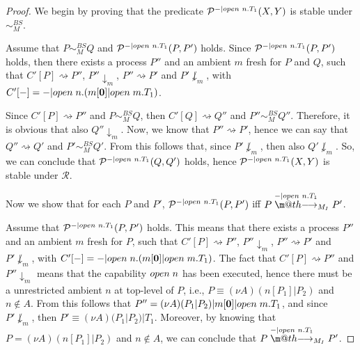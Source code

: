 \documentclass[copyright,creativecommons]{eptcs}
\makeatletter
\newcommand{\nil}{\mathbf{0}}
\def\tr#1{\stackrel{#1}{\to}}
\let\oldrightarrow\to
\renewcommand{\to}[1][]{\ifthenelse{\equal{#1}{}}{\oldrightarrow}{\ensuremath{\xrightarrow{{}_{#1}}}}}
\def \rightarrowfill{\m@th\mathord{\smash-}\mkern-6mu\cleaders\hbox{$\mkern-2mu\mathord{\smash-}\mkern-2mu$}\hfill
  \mkern-6mu\mathord\rightarrow}
\newcommand{\barb}[1]{\downarrow_{#1}}
\newcommand{\bsbis}{\sim^{BS}}
\def\tr#1{\stackrel{#1}{\rightarrowfill}}
\newcommand{\react}{\rightsquigarrow}
\newcommand{\<}{\langle}
\renewcommand{\>}{\rangle}
\def\tr#1{\stackrel{#1}{\rightarrowfill}}
\def \rightarrowfill{\m@th\mathord{\smash-}\mkern-6mu\cleaders\hbox{$\mkern-2mu\mathord{\smash-}\mkern-2mu$}\hfill
  \mkern-6mu\mathord\rightarrow}
\makeatother
\begin{document}
\begin{proof}
We begin by proving that the predicate $\mathcal P^{-|open \hspace{1mm} n.T_1}(X,Y)$
is stable under $\bsbis_{\scriptscriptstyle{M}}$.

Assume that $P \bsbis_{\scriptscriptstyle{M}} Q$ and $\mathcal P^{-|open \hspace{1mm} n.T_1}(P,P')$ holds.
Since $\mathcal P^{-|open \hspace{1mm} n.T_1}(P,P')$ holds, then
there exists a process $P''$ and an ambient $m$ fresh for $P$ and $Q$,
such that $C'[P] \react P''$, $P'' \barb m$,
$P'' \react P'$ and $P' \not \barb m$, with
$C'[-] = -|open \hspace{1mm} n.(m[\nil]|open \hspace{1mm} m.T_1)$.

Since $C'[P] \react P''$ and $P \bsbis_{\scriptscriptstyle{M}} Q$, then
$C'[Q] \react Q''$ and $P'' \bsbis_{\scriptscriptstyle{M}} Q''$.
Therefore, it is obvious that also $Q'' \barb m$.
Now, we know that $P'' \react P'$, hence we can say
that $Q'' \react Q'$ and $P' \bsbis_{\scriptscriptstyle{M}} Q'$.
From this follows that, since $P' \not \barb m$, then also $Q' \not \barb m$.
So, we can conclude that $\mathcal P^{-|open \hspace{1mm} n.T_1}(Q,Q')$ holds, hence $\mathcal P^{-|open \hspace{1mm} n.T_1}(X,Y)$
is stable under $\mathcal R$.

Now we show that for each $P$ and $P'$, $\mathcal P^{-|open \hspace{1mm} n.T_1}(P,P')$ iff
$P \tr{-|open \hspace{1mm} n.T_1}_{M_I} P'$.

Assume that $\mathcal P^{-|open \hspace{1mm} n.T_1}(P,P')$ holds.
This means that there exists a process $P''$ and an ambient $m$ fresh for $P$,
such that $C'[P] \react P''$, $P'' \barb m$,
$P'' \react P'$ and $P' \not \barb m$, with
$C'[-] = -|open \hspace{1mm} n.(m[\nil]|open \hspace{1mm} m.T_1)$.
The fact that $C'[P] \react P''$ and $P'' \barb m$ means that
the capability $open \hspace{1mm} n$ has been executed, hence
there must be a unrestricted ambient $n$ at top-level of $P$, i.e.,
$P \equiv (\nu A) (n[P_1]|P_2)$ and $n \not \in A$.
From this follows that $P'' = (\nu A)(P_1|P_2)|m[\nil]|open \hspace{1 mm} m.T_1$,
and since $P' \not \barb m$, then $P' \equiv (\nu A) (P_1|P_2)|T_1$.
Moreover, by knowing that $P = (\nu A) (n[P_1]|P_2)$ and $n \not \in A$,
we can conclude that $P \tr{-|open \hspace{1mm} n.T_1}_{M_I} P'$.


\end{proof}
\end{document}

